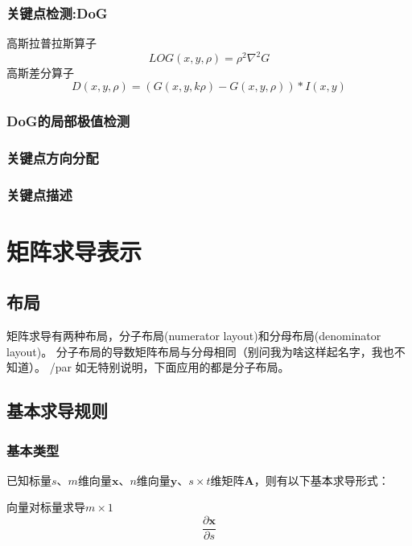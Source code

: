\documentclass{ctexart}
\begin{document}
	\subsubsection{关键点检测:DoG}
	高斯拉普拉斯算子
	\begin{equation}
	LOG(x,y,\rho)=\rho^2 \nabla^2 G
	\end{equation}
	高斯差分算子
	\begin{equation}
	D(x,y,\rho)=\left(G(x,y,k\rho)-G(x,y,\rho)\right)*I(x,y)
	\end{equation}
	\subsubsection{DoG的局部极值检测}
	
	\subsubsection{关键点方向分配}
	
	\subsubsection{关键点描述}
	
	
	
	\section{矩阵求导表示}
	\subsection{布局}
	矩阵求导有两种布局，分子布局(numerator layout)和分母布局(denominator layout)。
	分子布局的导数矩阵布局与分母相同（别问我为啥这样起名字，我也不知道）。
	/par 如无特别说明，下面应用的都是分子布局。	
	\subsection{基本求导规则}
	\subsubsection{基本类型}
	\par 已知标量$s$、$m$维向量$\boldsymbol{x}$、$n$维向量$\boldsymbol{y}$、$s\times t$维矩阵$\boldsymbol{A}$，则有以下基本求导形式：
	
	\par 向量对标量求导$m\times 1$
	\begin{equation}
	\frac{\partial\boldsymbol{x}}{\partial s}
	\end{equation}
	
\end{document}
